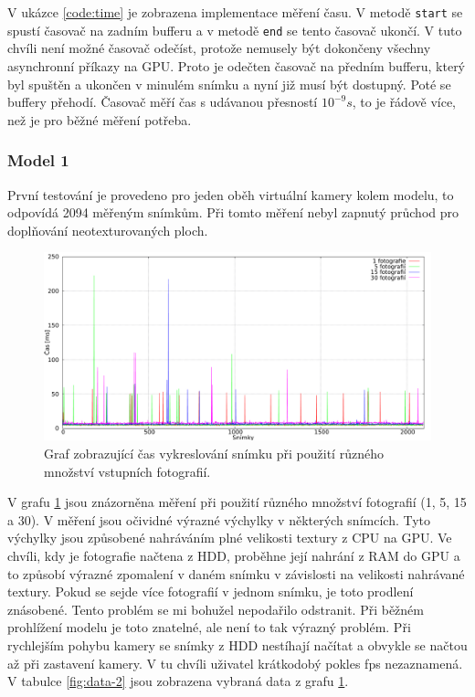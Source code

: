 \documentclass[11pt,twoside,a4paper]{book}
\begin{document}
V ukázce \ref{code:time} je zobrazena implementace měření času. V metodě \texttt{start} se spustí časovač na zadním bufferu a v metodě \texttt{end} se tento časovač ukončí. V tuto chvíli není možné časovač odečíst, protože nemusely být dokončeny všechny asynchronní příkazy na GPU. Proto je odečten časovač na předním bufferu, který byl spuštěn a ukončen v minulém snímku a nyní již musí být dostupný. Poté se buffery přehodí. Časovač měří čas s udávanou přesností $10^{-9}s$, to je řádově více, než je pro běžné měření potřeba.

\subsubsection*{Model 1}
První testování je provedeno pro jeden oběh virtuální kamery kolem modelu, to odpovídá 2094 měřeným snímkům. Při tomto měření nebyl zapnutý průchod pro doplňování neotexturovaných ploch.

\begin{figure}[h]
\begin{center}
\includegraphics[width=\textwidth]{figures/data-1}
\caption{Graf zobrazující čas vykreslování snímku při použití různého množství vstupních fotografií.}
\label{fig:data-1}
\end{center}
\end{figure}


V grafu \ref{fig:data-1} jsou znázorněna měření při použití různého množství fotografií (1, 5, 15 a 30). V měření jsou očividné výrazné výchylky v některých snímcích. Tyto výchylky jsou způsobené nahráváním plné velikosti textury z CPU na GPU. Ve chvíli, kdy je fotografie načtena z  HDD, proběhne její nahrání z RAM do GPU a to způsobí výrazné zpomalení v daném snímku v závislosti na velikosti nahrávané textury. Pokud se sejde více fotografií v jednom snímku, je toto prodlení znásobené. Tento problém se mi bohužel nepodařilo odstranit. Při běžném prohlížení modelu je toto znatelné, ale není to tak výrazný problém. Při rychlejším pohybu kamery se snímky z HDD nestíhají načítat a obvykle se načtou až při zastavení kamery. V tu chvíli uživatel krátkodobý pokles fps nezaznamená. V tabulce \ref{fig:data-2} jsou zobrazena vybraná data z grafu \ref{fig:data-1}. 
\end{document}
